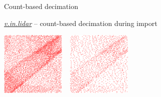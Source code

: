 \documentclass[xcolor={dvipsnames,usenames},beamer,aspectratio=1610]{beamer}
\newcommand{\gmodule}[1]{\href{http://grass.osgeo.org/grass71/manuals/#1.html}{\emph{#1}}}
\begin{document}
\begin{frame}{Count-based decimation}

\gmodule{v.in.lidar} -- count-based decimation during import

\begin{center}
\begin{minipage}{0.96\textwidth}
%
\newcommand{\imgsize}{0.23\textwidth}
\includegraphics[width=\imgsize]{features/full}%
~%
\includegraphics[width=\imgsize]{features/preserve}%

\end{minipage}
\end{center}
\end{frame}
\end{document}
